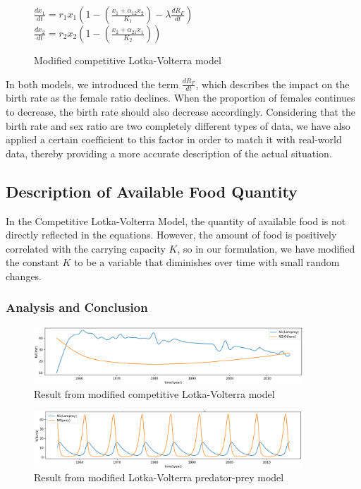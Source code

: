 \documentclass[12pt]{article}
\begin{document}
\begin{figure}[ht]
	\large
	\centering
	$\frac{dx_1}{dt}=r_1x_1(1-(\frac{x_1+\alpha_{12}x_2}{K_1})- \lambda \frac{dR_F}{dt})$\\
	$\frac{dx_2}{dt}=r_2x_2(1-(\frac{x_2+\alpha_{21}x_1}{K_2}))$
	\caption*{Modified competitive Lotka-Volterra model}
\end{figure}
In both models, we introduced the term $\frac{dR_F}{dt}$, which describes the impact on the birth
rate as the female ratio declines. When the proportion of females continues to decrease, the
birth rate should also decrease accordingly. Considering that the birth rate and sex ratio are
two completely different types of data, we have also applied a certain coefficient to this factor
in order to match it with real-world data, thereby providing a more accurate description of the
actual situation.
\subsection*{Description of Available Food Quantity}
In the Competitive Lotka-Volterra Model, the quantity of available food is not directly reflected
in the equations. However, the amount of food is positively correlated with the carrying
capacity $K$, so in our formulation, we have modified the constant $K$ to be a variable that
diminishes over time with small random changes.
\subsubsection{Analysis and Conclusion}
\begin{figure}[ht]
	\centering
	\includegraphics[width=0.9\textwidth]{Q1_LVComp.png}
	\caption{Result from modified competitive Lotka-Volterra model}
\end{figure}
\begin{figure}[ht]
	\centering
	\includegraphics[width=0.9\textwidth]{Q1_LVPP.png}
	\caption{Result from modified Lotka-Volterra predator-prey model}
\end{figure}
\end{document}
